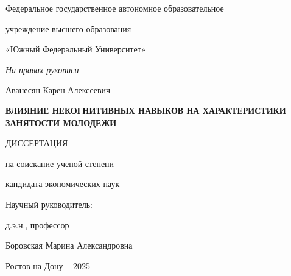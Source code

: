 
\begin{titlepage}
\thispagestyle{empty}
\begin{center}
{\fontsize{16pt}{18.4pt}\selectfont Федеральное государственное автономное образовательное\par}
{\fontsize{16pt}{18.4pt}\selectfont учреждение высшего образования\par}
{\fontsize{16pt}{18.4pt}\selectfont «Южный Федеральный Университет»\par}
\end{center}

\vspace{1.2cm}

\begin{flushright}
{\fontsize{14pt}{16.1pt}\selectfont\itshape На правах рукописи\par}
\end{flushright}

\vspace{2.0cm}

\begin{center}
{\fontsize{16pt}{18.4pt}\selectfont Аванесян Карен Алексеевич\par}

\vspace{1.1cm}

{\fontsize{16pt}{18.4pt}\selectfont\bfseries ВЛИЯНИЕ НЕКОГНИТИВНЫХ НАВЫКОВ НА ХАРАКТЕРИСТИКИ ЗАНЯТОСТИ МОЛОДЕЖИ\par}

\vspace{0.8cm}

{\fontsize{16pt}{18.4pt}\selectfont ДИССЕРТАЦИЯ\par}
{\fontsize{16pt}{18.4pt}\selectfont на соискание ученой степени\par}
{\fontsize{16pt}{18.4pt}\selectfont кандидата экономических наук\par}
\end{center}

\vspace{2.0cm}

\begin{flushright}
{\fontsize{16pt}{18.4pt}\selectfont Научный руководитель:\par}
{\fontsize{16pt}{18.4pt}\selectfont д.э.н., профессор\par}
{\fontsize{16pt}{18.4pt}\selectfont Боровская Марина Александровна\par}
\end{flushright}

\vfill

\begin{center}
{\fontsize{16pt}{18.4pt}\selectfont Ростов-на-Дону -- 2025\par}
\end{center}
\end{titlepage}

\clearpage
{}
\setcounter{page}{1}
\tableofcontents
\clearpage
